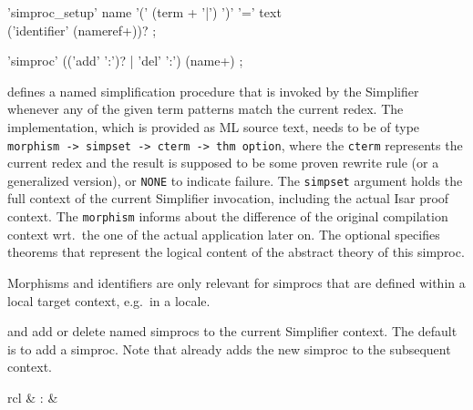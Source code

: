 \begin{isabellebody}
\begin{isamarkuptext}
  \begin{rail}
    'simproc\_setup' name '(' (term + '|') ')' '=' text \\ ('identifier' (nameref+))?
    ;

    'simproc' (('add' ':')? | 'del' ':') (name+)
    ;
  \end{rail}

  \begin{descr}

  \item [\mbox{\isa{\isacommand{simproc{\isacharunderscore}setup}}}] defines a named simplification
  procedure that is invoked by the Simplifier whenever any of the
  given term patterns match the current redex.  The implementation,
  which is provided as ML source text, needs to be of type \verb|morphism -> simpset -> cterm -> thm option|, where the \verb|cterm| represents the current redex  and the result is
  supposed to be some proven rewrite rule  (or a
  generalized version), or \verb|NONE| to indicate failure.  The
  \verb|simpset| argument holds the full context of the current
  Simplifier invocation, including the actual Isar proof context.  The
  \verb|morphism| informs about the difference of the original
  compilation context wrt.\ the one of the actual application later
  on.  The optional \mbox{} specifies theorems that
  represent the logical content of the abstract theory of this
  simproc.

  Morphisms and identifiers are only relevant for simprocs that are
  defined within a local target context, e.g.\ in a locale.

  \item [\isa{simproc\ add{\isacharcolon}\ name} and \isa{simproc\ del{\isacharcolon}\ name}]
  add or delete named simprocs to the current Simplifier context.  The
  default is to add a simproc.  Note that \mbox{}
  already adds the new simproc to the subsequent context.

  \end{descr}%
\end{isamarkuptext}%
\isamarkuptrue%
%
\isamarkuptrue%
%
\begin{isamarkuptext}%
\begin{matharray}{rcl}
    \mbox{} & : & \isaratt \\
  \end{matharray}


\end{isamarkuptext}
\end{isabellebody}

